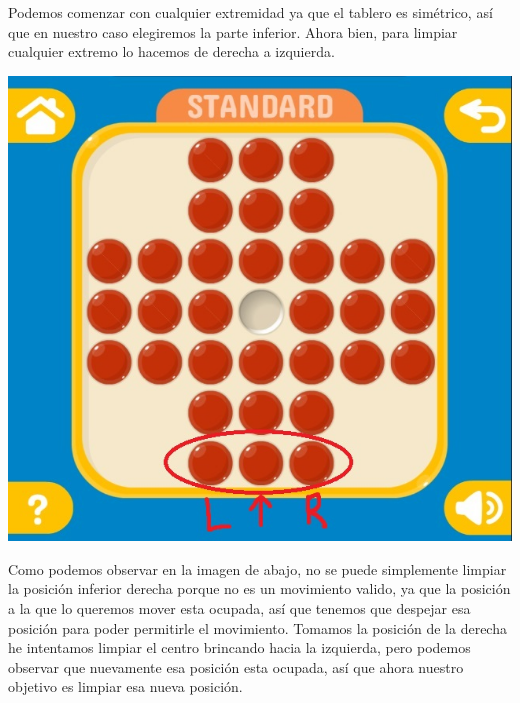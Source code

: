 \documentclass[10pt,a4paper]{report}
\begin{document}
Podemos comenzar con cualquier extremidad ya que el tablero es simétrico, así que en nuestro caso elegiremos la parte inferior. Ahora bien, para limpiar cualquier extremo lo hacemos
de derecha a izquierda.

\begin{center}
	\includegraphics[scale=.3]{2.jpg} \hspace{6cm} 
\end{center}

\pagebreak 

Como podemos observar en la imagen de abajo, no se puede simplemente limpiar la posición inferior derecha porque no es un movimiento valido, ya que la posición a la que lo queremos mover esta ocupada, así que tenemos que despejar esa posición para poder permitirle el movimiento. Tomamos la posición de la derecha he intentamos limpiar el centro brincando hacia la izquierda, pero podemos observar que nuevamente esa posición esta ocupada, así que ahora nuestro objetivo es limpiar esa nueva posición.
\end{document}

